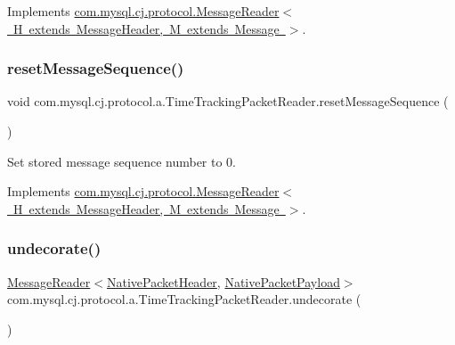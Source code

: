 Implements \mbox{\hyperlink{interfacecom_1_1mysql_1_1cj_1_1protocol_1_1_message_reader_a09745b0e30f74fa13e2b32f22ce70cbb}{com.\+mysql.\+cj.\+protocol.\+Message\+Reader$<$ H extends Message\+Header, M extends Message $>$}}.

\mbox{\label{classcom_1_1mysql_1_1cj_1_1protocol_1_1a_1_1_time_tracking_packet_reader_a1029b1583cd042d202fa0caa956a13c2}} 
\subsubsection{\texorpdfstring{reset\+Message\+Sequence()}{resetMessageSequence()}}
{\footnotesize\ttfamily void com.\+mysql.\+cj.\+protocol.\+a.\+Time\+Tracking\+Packet\+Reader.\+reset\+Message\+Sequence (\begin{DoxyParamCaption}{ }\end{DoxyParamCaption})}

Set stored message sequence number to 0. 

Implements \mbox{\hyperlink{interfacecom_1_1mysql_1_1cj_1_1protocol_1_1_message_reader_a3161e55ab8c1bb4d533aa6d2700fb14d}{com.\+mysql.\+cj.\+protocol.\+Message\+Reader$<$ H extends Message\+Header, M extends Message $>$}}.

\mbox{\label{classcom_1_1mysql_1_1cj_1_1protocol_1_1a_1_1_time_tracking_packet_reader_aebbbca667b7f55074795c128c2aff259}} 
\subsubsection{\texorpdfstring{undecorate()}{undecorate()}}
{\footnotesize\ttfamily \mbox{\hyperlink{interfacecom_1_1mysql_1_1cj_1_1protocol_1_1_message_reader}{Message\+Reader}}$<$\mbox{\hyperlink{classcom_1_1mysql_1_1cj_1_1protocol_1_1a_1_1_native_packet_header}{Native\+Packet\+Header}}, \mbox{\hyperlink{classcom_1_1mysql_1_1cj_1_1protocol_1_1a_1_1_native_packet_payload}{Native\+Packet\+Payload}}$>$ com.\+mysql.\+cj.\+protocol.\+a.\+Time\+Tracking\+Packet\+Reader.\+undecorate (\begin{DoxyParamCaption}{ }\end{DoxyParamCaption})}

